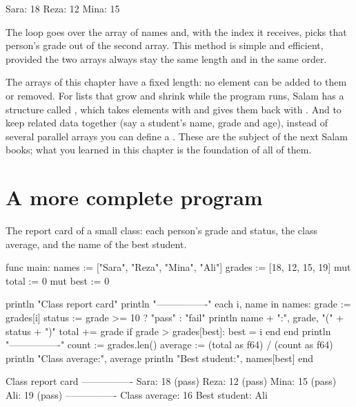 \begin{salamout}
Sara: 18
Reza: 12
Mina: 15
\end{salamout}

The loop goes over the array of names and, with the index it receives, picks
that person's grade out of the second array. This method is simple and
efficient, provided the two arrays always stay the same length and in the
same order.

\begin{deep}
The arrays of this chapter have a fixed length: no element can be added to
them or removed. For lists that grow and shrink while the program runs,
Salam has a structure called , which takes elements with
 and gives them back with . And to keep related data
together (say a student's name, grade and age), instead of several parallel
arrays you can define a . These are the subject of the next
Salam books; what you learned in this chapter is the foundation of all of
them.
\end{deep}

\section{A more complete program}

The report card of a small class: each person's grade and status, the class
average, and the name of the best student.

\begin{salamcode}
func main:
    names := ["Sara", "Reza", "Mina", "Ali"]
    grades := [18, 12, 15, 19]
    mut total := 0
    mut best := 0

    println "Class report card"
    println "----------------"
    each i, name in names:
        grade := grades[i]
        status := grade >= 10 ? "pass" : "fail"
        println name + ":", grade, "(" + status + ")"
        total += grade
        if grade > grades[best]: best = i end
    end
    println "----------------"
    count := grades.len()
    average := (total as f64) / (count as f64)
    println "Class average:", average
    println "Best student:", names[best]
end
\end{salamcode}

\begin{salamout}
Class report card
----------------
Sara: 18 (pass)
Reza: 12 (pass)
Mina: 15 (pass)
Ali: 19 (pass)
----------------
Class average: 16
Best student: Ali
\end{salamout}

